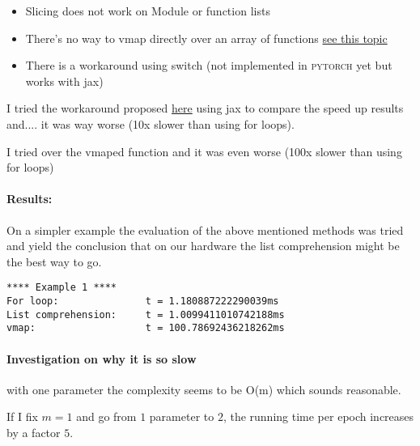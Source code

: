 \begin{itemize}
    \item Slicing does not work on Module or function lists
    \item There's no way to vmap directly over an array of functions \href{https://github.com/google/jax/issues/673}{see this topic}
    \item There is a workaround using switch (not implemented in \textsc{pytorch} yet but works with jax)
\end{itemize}

I tried the workaround proposed \href{https://github.com/google/jax/issues/673}{here} using jax to compare the speed up results and.... it was way worse (10x slower than using for loops).

I tried  over the vmaped function and it was even worse (100x slower than using for loops)



\paragraph{Results:}
On a simpler example the evaluation of the above mentioned methods was tried and yield the conclusion that on our hardware the list comprehension might be the best way to go.
\begin{verbatim}
**** Example 1 ****
For loop:               t = 1.180887222290039ms
List comprehension:     t = 1.0099411010742188ms
vmap:                   t = 100.78692436218262ms
\end{verbatim}


\paragraph{Investigation on why it is so slow}

with one parameter the complexity seems to be O(m) which sounds reasonable.

If I fix $m=1$ and go from $1$ parameter to $2$, the running time per epoch increases by a factor $5$.




